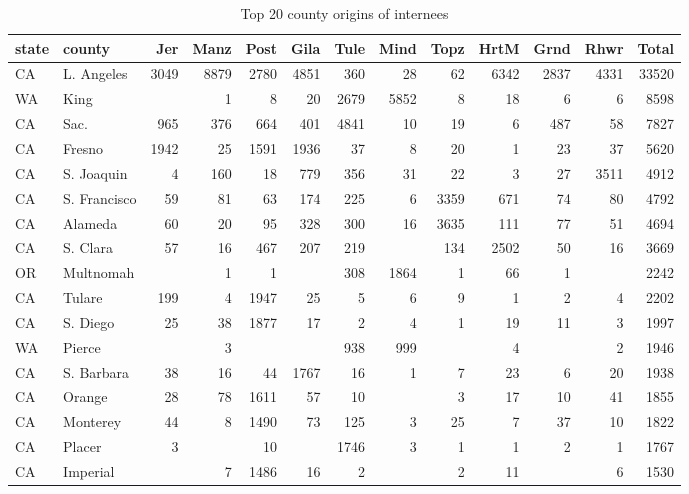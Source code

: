 \documentclass[12pt]{article}
\begin{document}
\begin{table}[ht]
  \caption{\label{tbl:cmp-cty} Top 20 county origins of internees}
  \setlength{\tabcolsep}{4pt}
  \begin{adjustbox}{width=\textwidth, center}
  \begin{tabular}{|ll|r|r|r|r|r|r|r|r|r|r|r|}
    \hline
    state & county & Jer & Manz & Post & Gila & Tule & Mind & Topz & HrtM & Grnd & Rhwr & Total \\ 
    \hline
    CA & L. Angeles & 3049 & 8879 & 2780 & 4851 & 360 &  28 &  62 & 6342 & 2837 & 4331 & 33520 \\ 
    WA & King &  &   1 &   8 &  20 & 2679 & 5852 &   8 &  18 &   6 &   6 & 8598 \\ 
    CA & Sac. & 965 & 376 & 664 & 401 & 4841 &  10 &  19 &   6 & 487 &  58 & 7827 \\ 
    CA & Fresno & 1942 &  25 & 1591 & 1936 &  37 &   8 &  20 &   1 &  23 &  37 & 5620 \\ 
    CA & S. Joaquin &   4 & 160 &  18 & 779 & 356 &  31 &  22 &   3 &  27 & 3511 & 4912 \\ 
    CA & S. Francisco &  59 &  81 &  63 & 174 & 225 &   6 & 3359 & 671 &  74 &  80 & 4792 \\ 
    CA & Alameda &  60 &  20 &  95 & 328 & 300 &  16 & 3635 & 111 &  77 &  51 & 4694 \\ 
    CA & S. Clara &  57 &  16 & 467 & 207 & 219 &  & 134 & 2502 &  50 &  16 & 3669 \\ 
    OR & Multnomah &  &   1 &   1 &  & 308 & 1864 &   1 &  66 &   1 &  & 2242 \\ 
    CA & Tulare & 199 &   4 & 1947 &  25 &   5 &   6 &   9 &   1 &   2 &   4 & 2202 \\ 
    CA & S. Diego &  25 &  38 & 1877 &  17 &   2 &   4 &   1 &  19 &  11 &   3 & 1997 \\ 
    WA & Pierce &  &   3 &  &  & 938 & 999 &  &   4 &  &   2 & 1946 \\ 
    CA & S. Barbara &  38 &  16 &  44 & 1767 &  16 &   1 &   7 &  23 &   6 &  20 & 1938 \\ 
    CA & Orange &  28 &  78 & 1611 &  57 &  10 &  &   3 &  17 &  10 &  41 & 1855 \\ 
    CA & Monterey &  44 &   8 & 1490 &  73 & 125 &   3 &  25 &   7 &  37 &  10 & 1822 \\ 
    CA & Placer &   3 &  &  10 &  & 1746 &   3 &   1 &   1 &   2 &   1 & 1767 \\ 
    CA & Imperial &  &   7 & 1486 &  16 &   2 &  &   2 &  11 &  &   6 & 1530 \\ 

\end{tabular}
\end{adjustbox}
\end{table}
\end{document}
